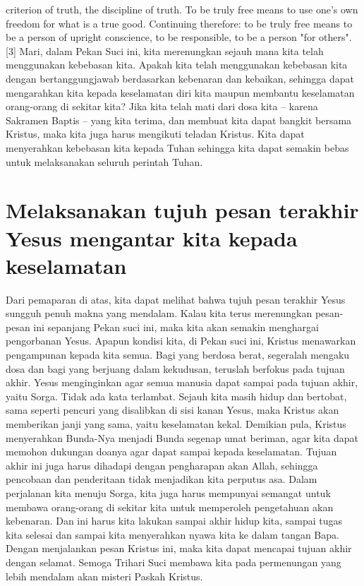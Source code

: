 criterion of truth, the discipline of truth. To be truly free means to use
one’s own freedom for what is a true good. Continuing therefore: to be truly
free means to be a person of upright conscience, to be responsible, to be a
person "for others".[3]
Mari, dalam Pekan Suci ini, kita merenungkan sejauh mana kita telah menggunakan
kebebasan kita. Apakah kita telah menggunakan kebebasan kita dengan
bertanggungjawab berdasarkan kebenaran dan kebaikan, sehingga dapat mengarahkan
kita kepada keselamatan diri kita maupun membantu keselamatan orang-orang di
sekitar kita? Jika kita telah mati dari dosa kita – karena Sakramen Baptis –
yang kita terima, dan membuat kita dapat bangkit bersama Kristus, maka kita
juga harus mengikuti teladan Kristus. Kita dapat menyerahkan kebebasan kita
kepada Tuhan sehingga kita dapat semakin bebas untuk melaksanakan seluruh
perintah Tuhan.

\section{Melaksanakan tujuh pesan terakhir Yesus mengantar kita kepada keselamatan}

Dari pemaparan di atas, kita dapat melihat bahwa tujuh pesan terakhir Yesus
sungguh penuh makna yang mendalam. Kalau kita terus merenungkan pesan-pesan ini
sepanjang Pekan suci ini, maka kita akan semakin menghargai pengorbanan Yesus.
Apapun kondisi kita, di Pekan suci ini, Kristus menawarkan pengampunan kepada
kita semua. Bagi yang berdosa berat, segeralah mengaku dosa dan bagi yang
berjuang dalam kekudusan, teruslah berfokus pada tujuan akhir. Yesus
menginginkan agar semua manusia dapat sampai pada tujuan akhir, yaitu Sorga.
Tidak ada kata terlambat. Sejauh kita masih hidup dan bertobat, sama seperti
pencuri yang disalibkan di sisi kanan Yesus, maka Kristus akan memberikan janji
yang sama, yaitu keselamatan kekal.
Demikian pula, Kristus menyerahkan Bunda-Nya menjadi Bunda segenap umat
beriman, agar kita dapat memohon dukungan doanya agar dapat sampai kepada
keselamatan. Tujuan akhir ini juga harus dihadapi dengan pengharapan akan
Allah, sehingga pencobaan dan penderitaan tidak menjadikan kita perputus asa.
Dalam perjalanan kita menuju Sorga, kita juga harus mempunyai semangat untuk
membawa orang-orang di sekitar kita untuk memperoleh pengetahuan akan
kebenaran. Dan ini harus kita lakukan sampai akhir hidup kita, sampai tugas
kita selesai dan sampai kita menyerahkan nyawa kita ke dalam tangan Bapa.
Dengan menjalankan pesan Kristus ini, maka kita dapat mencapai tujuan akhir
dengan selamat.
Semoga Trihari Suci membawa kita pada permenungan yang lebih mendalam akan
misteri Paskah Kristus.

